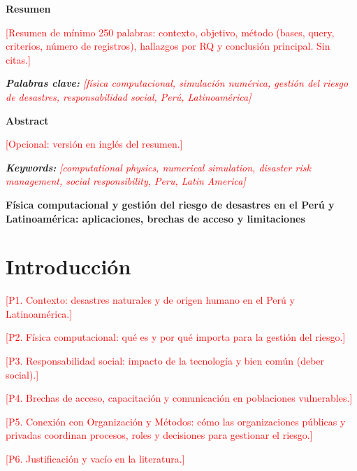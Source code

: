 \documentclass[12pt,a4paper]{article}
\newcommand{\relleno}[1]{\textcolor{red}{[#1]}}
\newcommand{\titulo}{Física computacional y gestión del riesgo de desastres en el Perú y Latinoamérica: aplicaciones, brechas de acceso y limitaciones}
\begin{document}
\hypersetup{pageanchor=false}

\hypersetup{pageanchor=true}

\newpage
\begin{center}\textbf{Resumen}\end{center}
\noindent\relleno{Resumen de mínimo 250 palabras: contexto, objetivo, método (bases, query, criterios, número de registros), hallazgos por RQ y conclusión principal. Sin citas.}

\vspace{0.5\baselineskip}
\noindent\textbf{\textit{Palabras clave:}} \textit{\relleno{física computacional, simulación numérica, gestión del riesgo de desastres, responsabilidad social, Perú, Latinoamérica}}

\vspace{1\baselineskip}
\begin{center}\textbf{Abstract}\end{center}
\noindent\relleno{Opcional: versión en inglés del resumen.}

\vspace{0.5\baselineskip}
\noindent\textbf{\textit{Keywords:}} \textit{\relleno{computational physics, numerical simulation, disaster risk management, social responsibility, Peru, Latin America}}

\newpage
\begin{center}\textbf{\titulo}\end{center}
\section{Introducción}
\relleno{P1. Contexto: desastres naturales y de origen humano en el Perú y Latinoamérica.}

\relleno{P2. Física computacional: qué es y por qué importa para la gestión del riesgo.}

\relleno{P3. Responsabilidad social: impacto de la tecnología y bien común (deber social).}

\relleno{P4. Brechas de acceso, capacitación y comunicación en poblaciones vulnerables.}

\relleno{P5. Conexión con Organización y Métodos: cómo las organizaciones públicas y privadas coordinan procesos, roles y decisiones para gestionar el riesgo.}

\relleno{P6. Justificación y vacío en la literatura.}
\end{document}
